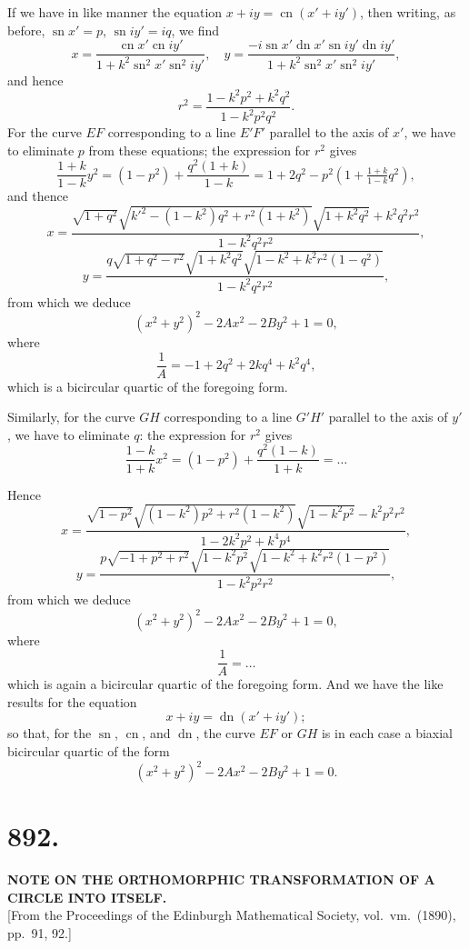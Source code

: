 \documentclass[11pt,a4paper]{article}
\DeclareMathOperator{\sn}{sn}
\DeclareMathOperator{\cn}{cn}
\DeclareMathOperator{\dn}{dn}
\begin{document}
If we have in like manner the equation $x + iy = \cn(x' + iy')$, then writing, as before, $\sn x' = p$, $\sn iy' = iq$, we find
\[
x = \frac{\cn x' \cn iy'}{1 + k^2 \sn^2 x' \sn^2 iy'},\quad y = \frac{-i\sn x' \dn x' \sn iy' \dn iy'}{1 + k^2 \sn^2 x' \sn^2 iy'},
\]
and hence
\[
r^2 = \frac{1 - k^2p^2 + k^2q^2}{1 - k^2p^2q^2}.
\]
For the curve $EF$ corresponding to a line $E'F'$ parallel to the axis of $x'$, we have to eliminate $p$ from these equations; the expression for $r^2$ gives
\[
\frac{1+k}{1-k}y^2 = (1-p^2) + \frac{q^2(1+k)}{1-k} = 1 + 2q^2 - p^2(1+\tfrac{1+k}{1-k}q^2),
\]
and thence
\[
x = \frac{\sqrt{1+q^2}\sqrt{k'^2-(1-k^2)q^2+r^2(1+k^2)}\sqrt{1+k^2q^2}+k^2q^2r^2}{1-k^2q^2r^2},
\]
\[
y = \frac{q\sqrt{1+q^2-r^2}\sqrt{1+k^2q^2}\sqrt{1-k^2+k^2r^2(1-q^2)}}{1-k^2q^2r^2},
\]
from which we deduce
\[
(x^2+y^2)^2 - 2Ax^2 - 2By^2 + 1 = 0,
\]
where
\[
\frac{1}{A} = -1 + 2q^2 + 2kq^4 + k^2q^4,
\]
which is a bicircular quartic of the foregoing form.

Similarly, for the curve $GH$ corresponding to a line $G'H'$ parallel to the axis of $y'$, we have to eliminate $q$: the expression for $r^2$ gives
\[
\frac{1-k}{1+k}x^2 = (1-p^2) + \frac{q^2(1-k)}{1+k} = \ldots
\]

Hence
\[
x = \frac{\sqrt{1-p^2}\sqrt{(1-k^2)p^2+r^2(1-k^2)}\sqrt{1-k^2p^2}-k^2p^2r^2}{1-2k^2p^2+k^4p^4},
\]
\[
y = \frac{p\sqrt{-1+p^2+r^2}\sqrt{1-k^2p^2}\sqrt{1-k^2+k^2r^2(1-p^2)}}{1-k^2p^2r^2},
\]
from which we deduce
\[
(x^2+y^2)^2 - 2Ax^2 - 2By^2 + 1 = 0,
\]
where
\[
\frac{1}{A} = \ldots
\]
which is again a bicircular quartic of the foregoing form. And we have the like results for the equation
\[
x + iy = \dn(x' + iy');
\]
so that, for the $\sn$, $\cn$, and $\dn$, the curve $EF$ or $GH$ is in each case a biaxial bicircular quartic of the form
\[
(x^2+y^2)^2 - 2Ax^2 - 2By^2 + 1 = 0.
\]


\section*{892.}
\begin{center}
{\large\bfseries NOTE ON THE ORTHOMORPHIC TRANSFORMATION OF A CIRCLE INTO ITSELF.}\\[0.5em]
\small [From the Proceedings of the Edinburgh Mathematical Society, vol.\ vm.\ (1890), pp.\ 91, 92.]
\end{center}
\end{document}
